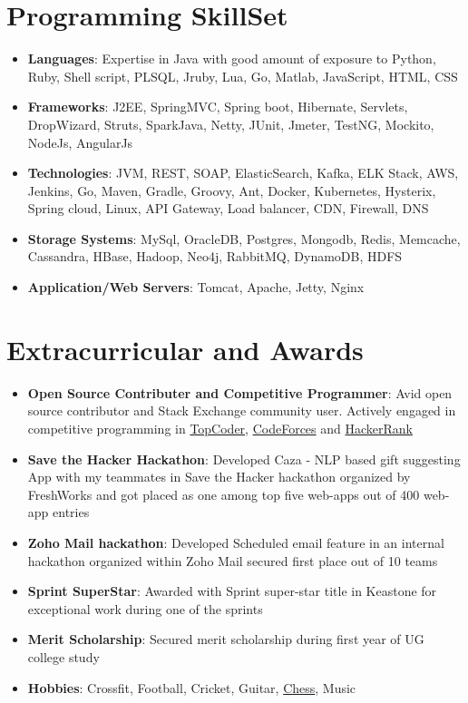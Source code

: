 \documentclass[letterpaper,11pt]{article}
\newcommand{\resumeItem}[2]{
  \item\small{
    \textbf{#1}{: #2 \vspace{-2pt}}
  }
}
\newcommand{\resumeSubItem}[2]{\resumeItem{#1}{#2}\vspace{-4pt}}
\newcommand{\resumeSubHeadingListStart}{\begin{itemize}[leftmargin=*]}
\newcommand{\resumeSubHeadingListEnd}{\end{itemize}}
\begin{document}
\section{Programming SkillSet}
  \resumeSubHeadingListStart
    \resumeSubItem{Languages}{Expertise in Java with good amount of exposure to Python, Ruby, Shell script, PLSQL, Jruby, Lua, Go, Matlab, JavaScript, HTML, CSS}
    \resumeSubItem{Frameworks}{J2EE, SpringMVC, Spring boot, Hibernate, Servlets, DropWizard, Struts, SparkJava, Netty, JUnit, Jmeter, TestNG, Mockito, NodeJs, AngularJs}
    \resumeSubItem{Technologies}{JVM, REST, SOAP, ElasticSearch, Kafka, ELK Stack, AWS, Jenkins, Go, Maven, Gradle, Groovy, Ant, Docker, Kubernetes, Hysterix, Spring cloud, Linux, API Gateway, Load balancer, CDN, Firewall, DNS}
    \resumeSubItem{Storage Systems}{MySql, OracleDB, Postgres, Mongodb, Redis, Memcache, Cassandra, HBase, Hadoop, Neo4j, RabbitMQ, DynamoDB, HDFS}
     \resumeSubItem{Application/Web Servers}{Tomcat, Apache, Jetty, Nginx}
     
  \resumeSubHeadingListEnd



\section{Extracurricular and Awards}
  \resumeSubHeadingListStart
    \resumeSubItem{Open Source Contributer and Competitive Programmer}
      {Avid open source contributor and Stack Exchange community user. Actively engaged in competitive programming in \href{}{TopCoder}, \href{}{CodeForces} and \href{}{HackerRank}}
    \resumeSubItem{Save the Hacker Hackathon}
      {Developed Caza - NLP based gift suggesting App with my teammates in Save the
Hacker hackathon organized by FreshWorks and got placed as one among top five web-apps out of 400 web-app entries}
    \resumeSubItem{Zoho Mail hackathon}
      {Developed Scheduled email feature in an internal hackathon organized within Zoho Mail secured first place out of 10 teams}
    \resumeSubItem{Sprint SuperStar}
      {Awarded with Sprint super-star title in Keastone for exceptional work during one of the sprints}
    \resumeSubItem{Merit Scholarship}
      {Secured merit scholarship during first year of UG college study}
      \resumeSubItem{Hobbies}
      {Crossfit, Football, Cricket, Guitar, {\href{https://www.chess.com/member/aarish24}{Chess}}, Music}
  \resumeSubHeadingListEnd

\end{document}
